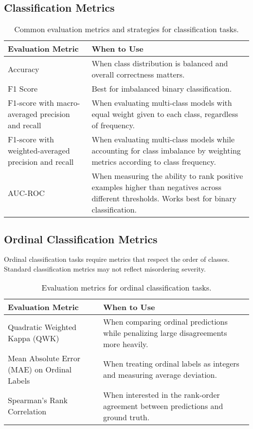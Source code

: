\documentclass[12pt,openany]{book}
\begin{document}
\subsection{Classification Metrics}

\begin{table}[H]
    \centering
    \small
    \renewcommand{\arraystretch}{1.3}
    \begin{tabular}{|l|p{9cm}|}
        \hline
        \textbf{Evaluation Metric} & \textbf{When to Use} \\
        \hline
        Accuracy & When class distribution is balanced and overall correctness matters. \\
        \hline
        F1 Score & Best for 
        imbalanced binary classification. \\
        \hline
        F1-score with macro-averaged precision and recall & When evaluating multi-class models with equal weight 
        given to each class, regardless of frequency. \\
        \hline
        F1-score with weighted-averaged precision and recall & When evaluating multi-class models while accounting 
        for class imbalance by weighting metrics according to class frequency. \\
        \hline
        AUC-ROC & When measuring the ability to rank positive examples higher than 
        negatives across different thresholds. Works best for binary classification. \\
        \hline
    \end{tabular}
    \caption{Common evaluation metrics and strategies for classification tasks.}
\end{table}


\subsection{Ordinal Classification Metrics}

Ordinal classification tasks require metrics that respect the 
order of classes. Standard classification metrics may not reflect 
misordering severity.

\begin{table}[H]
    \centering
    \small
    \renewcommand{\arraystretch}{1.3}
    \begin{tabular}{|l|p{9cm}|}
        \hline
        \textbf{Evaluation Metric} & \textbf{When to Use} \\
        \hline
        Quadratic Weighted Kappa (QWK) & When comparing ordinal predictions while penalizing large disagreements more heavily. \\
        \hline
        Mean Absolute Error (MAE) on Ordinal Labels & When treating ordinal labels as integers and measuring average deviation. \\
        \hline
        Spearman's Rank Correlation & When interested in the rank-order agreement between predictions and ground truth. \\
        \hline
    \end{tabular}
    \caption{Evaluation metrics for ordinal classification tasks.}
\end{table}
\end{document}
